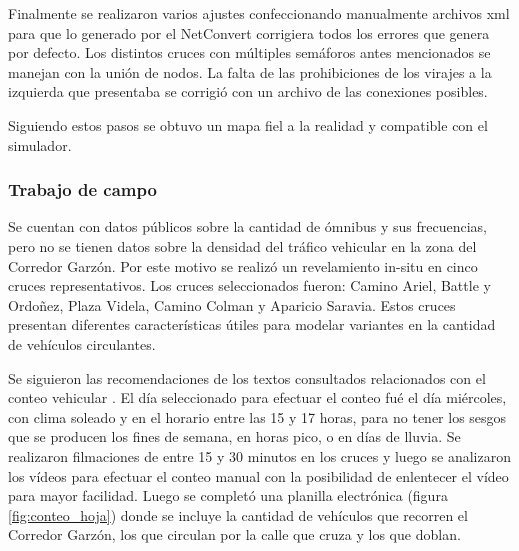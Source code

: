Finalmente se realizaron varios ajustes confeccionando manualmente archivos xml para que lo generado por el NetConvert corrigiera todos los errores que genera por defecto. Los distintos cruces con múltiples semáforos antes mencionados se manejan con la unión de nodos. La falta de las prohibiciones de los virajes a la izquierda que presentaba se corrigió con un archivo de las conexiones posibles.

Siguiendo estos pasos se obtuvo un mapa fiel a la realidad y compatible con el simulador.


\subsubsection{Trabajo de campo}
Se cuentan con datos públicos sobre la cantidad de ómnibus y sus frecuencias, pero no se tienen datos sobre la densidad del tráfico vehicular en la zona del Corredor Garzón. Por este motivo se realizó un revelamiento in-situ en cinco cruces representativos. Los cruces seleccionados fueron: Camino Ariel, Battle y Ordoñez, Plaza Videla, Camino Colman y Aparicio Saravia. Estos cruces presentan diferentes características útiles para modelar variantes en la cantidad de vehículos circulantes. 

Se siguieron las recomendaciones de los textos consultados relacionados con el conteo vehicular \citep{ConteoTrafico}. El día seleccionado para efectuar el conteo fué el día miércoles, con clima soleado y en el horario entre las 15 y 17 horas, para no tener los sesgos que se producen los fines de semana, en horas pico, o en días de lluvia. Se realizaron filmaciones de entre 15 y 30 minutos en los cruces y luego se analizaron los vídeos para efectuar el conteo manual con la posibilidad de enlentecer el vídeo para mayor facilidad. Luego se completó una planilla electrónica (figura \ref{fig:conteo_hoja}) donde se incluye la cantidad de vehículos que recorren el Corredor Garzón, los que circulan por la calle que cruza y los que doblan. 

